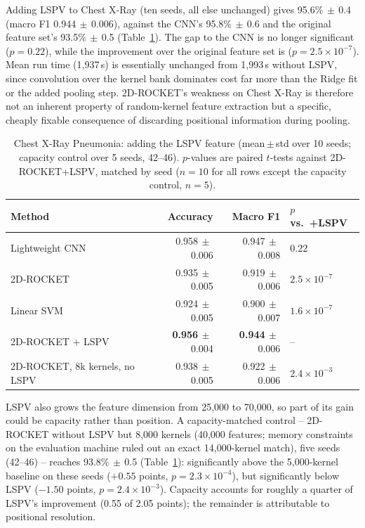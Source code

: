 \documentclass[a4paper,fleqn]{cas-sc}
\newcommand{\std}[1]{$\,\pm\,$#1}
\begin{document}
Adding LSPV to Chest X-Ray (ten seeds, all else unchanged) gives 95.6\%\std{0.4} (macro F1 0.944\std{0.006}), against the CNN's 95.8\%\std{0.6} and the original feature set's 93.5\%\std{0.5} (Table~\ref{tbl:lspv}). The gap to the CNN is no longer significant ($p=0.22$), while the improvement over the original feature set is ($p=2.5\times10^{-7}$). Mean run time (1{,}937\,s) is essentially unchanged from 1{,}993\,s without LSPV, since convolution over the kernel bank dominates cost far more than the Ridge fit or the added pooling step. 2D-ROCKET's weakness on Chest X-Ray is therefore not an inherent property of random-kernel feature extraction but a specific, cheaply fixable consequence of discarding positional information during pooling.

\begin{table}
\caption{Chest X-Ray Pneumonia: adding the LSPV feature (mean\,$\pm$\,std over 10 seeds; capacity control over 5 seeds, 42--46). $p$-values are paired $t$-tests against 2D-ROCKET+LSPV, matched by seed ($n=10$ for all rows except the capacity control, $n=5$).}\label{tbl:lspv}
\begin{tabular*}{\tblwidth}{@{}lrrl@{}}
\toprule
Method & Accuracy & Macro F1 & $p$ vs.\ +LSPV \\
\midrule
Lightweight CNN     & 0.958\std{0.006} & 0.947\std{0.008} & $0.22$ \\
2D-ROCKET            & 0.935\std{0.005} & 0.919\std{0.006} & $2.5\times10^{-7}$ \\
Linear SVM           & 0.924\std{0.005} & 0.900\std{0.007} & $1.6\times10^{-7}$ \\
2D-ROCKET + LSPV & \textbf{0.956}\std{0.004} & \textbf{0.944}\std{0.006} & -- \\
\midrule
2D-ROCKET, 8k kernels, no LSPV & 0.938\std{0.005} & 0.922\std{0.006} & $2.4\times10^{-3}$ \\
\bottomrule
\end{tabular*}
\end{table}

LSPV also grows the feature dimension from 25,000 to 70,000, so part of its gain could be capacity rather than position. A capacity-matched control -- 2D-ROCKET without LSPV but 8,000 kernels (40,000 features; memory constraints on the evaluation machine ruled out an exact 14,000-kernel match), five seeds (42--46) -- reaches 93.8\%\std{0.5} (Table~\ref{tbl:lspv}): significantly above the 5,000-kernel baseline on these seeds ($+0.55$ points, $p=2.3\times10^{-4}$), but significantly below LSPV ($-1.50$ points, $p=2.4\times10^{-3}$). Capacity accounts for roughly a quarter of LSPV's improvement (0.55 of 2.05 points); the remainder is attributable to positional resolution.
\end{document}
